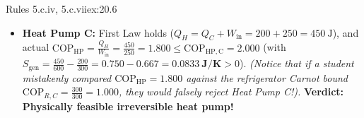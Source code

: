 \begin{workedexample}{Rules 5.c.iv, 5.c.vii}{ex:20.6}
\begin{itemize}
  \item \textbf{Heat Pump C:} First Law holds ($Q_H = Q_C + W_{\mathrm{in}} = 200 + 250 = \SI{450}{\joule}$), and actual $\mathrm{COP}_{\mathrm{HP}} = \frac{Q_H}{W_{\mathrm{in}}} = \frac{450}{250} = \mathbf{1.800} \le \mathrm{COP}_{\mathrm{HP,C}} = 2.000$ (with $S_{\mathrm{gen}} = \frac{450}{600} - \frac{200}{300} = 0.750 - 0.667 = \mathbf{\SI{+0.0833}{\joule\per\kelvin}} > 0$). \emph{(Notice that if a student mistakenly compared $\mathrm{COP}_{\mathrm{HP}} = 1.800$ against the refrigerator Carnot bound $\mathrm{COP}_{R,C} = \frac{300}{300} = 1.000$, they would falsely reject Heat Pump C!).} \textbf{Verdict: Physically feasible irreversible heat pump!}
\end{itemize}
\end{workedexample}

